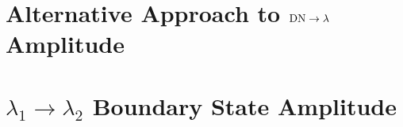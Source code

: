 \documentclass[preprint, prb]{revtex4-1}
\begin{document}
\section{Alternative Approach to ${\rm DN} \rightarrow \lambda$ Amplitude}
\label{app:gnd_dn_lambda}


\section{$\lambda_1 \rightarrow \lambda_2$ Boundary State Amplitude}
\label{app:lambda_12}




\end{document}
